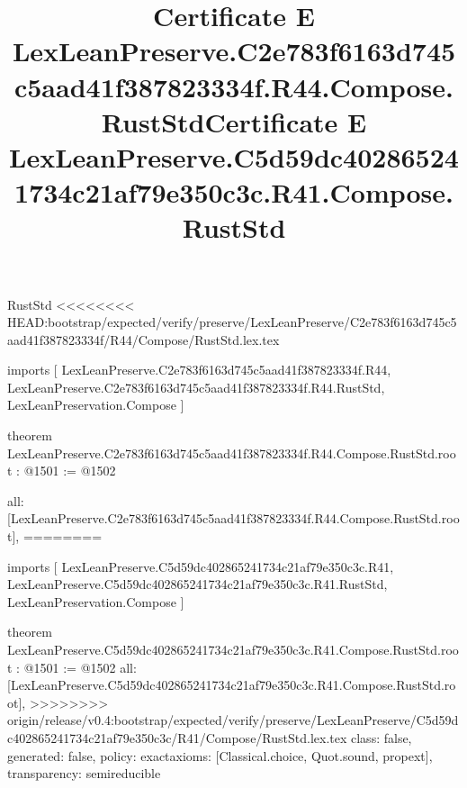 \begin{lexlean}{RustStd}
<<<<<<<< HEAD:bootstrap/expected/verify/preserve/LexLeanPreserve/C2e783f6163d745c5aad41f387823334f/R44/Compose/RustStd.lex.tex
\title{Certificate E LexLeanPreserve.C2e783f6163d745c5aad41f387823334f.R44.Compose.RustStd}
\begin{coremodule}
imports [
  LexLeanPreserve.C2e783f6163d745c5aad41f387823334f.R44,
  LexLeanPreserve.C2e783f6163d745c5aad41f387823334f.R44.RustStd,
  LexLeanPreservation.Compose
]

theorem LexLeanPreserve.C2e783f6163d745c5aad41f387823334f.R44.Compose.RustStd.root : @1501 := @1502 {
  all: [LexLeanPreserve.C2e783f6163d745c5aad41f387823334f.R44.Compose.RustStd.root],
========
\title{Certificate E LexLeanPreserve.C5d59dc402865241734c21af79e350c3c.R41.Compose.RustStd}
\begin{coremodule}
imports [
  LexLeanPreserve.C5d59dc402865241734c21af79e350c3c.R41,
  LexLeanPreserve.C5d59dc402865241734c21af79e350c3c.R41.RustStd,
  LexLeanPreservation.Compose
]

theorem LexLeanPreserve.C5d59dc402865241734c21af79e350c3c.R41.Compose.RustStd.root : @1501 := @1502 {
  all: [LexLeanPreserve.C5d59dc402865241734c21af79e350c3c.R41.Compose.RustStd.root],
>>>>>>>> origin/release/v0.4:bootstrap/expected/verify/preserve/LexLeanPreserve/C5d59dc402865241734c21af79e350c3c/R41/Compose/RustStd.lex.tex
  class: false,
  generated: false,
  policy: exact{axioms: [Classical.choice, Quot.sound, propext]},
  transparency: semireducible
}


\end{coremodule}}
\end{coremodule}
\end{lexlean}
